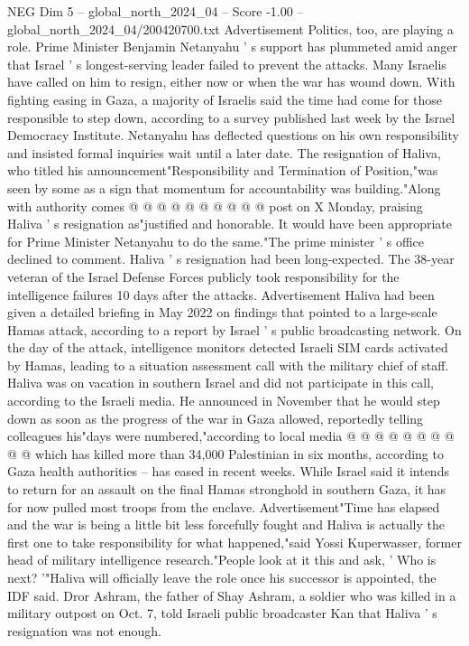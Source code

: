 \begin{textsample}{NEG Dim 5 – global\_north\_2024\_04 – Score -1.00 – global\_north\_2024\_04/200420700.txt}
Advertisement Politics, too, are playing a role.
Prime Minister Benjamin Netanyahu ' s support has plummeted amid anger that Israel ' s longest-serving leader failed to prevent the attacks.
Many Israelis have called on him to resign, either now or when the war has wound down.
With fighting easing in Gaza, a majority of Israelis said the time had come for those responsible to step down, according to a survey published last week by the Israel Democracy Institute.
Netanyahu has deflected questions on his own responsibility and insisted formal inquiries wait until a later date.
The resignation of Haliva, who titled his announcement"Responsibility and Termination of Position,"was seen by some as a sign that momentum for accountability was building."Along with authority comes @ @ @ @ @ @ @ @ @ @ post on X Monday, praising Haliva ' s resignation as"justified and honorable.
It would have been appropriate for Prime Minister Netanyahu to do the same."The prime minister ' s office declined to comment.
Haliva ' s resignation had been long-expected.
The 38-year veteran of the Israel Defense Forces publicly took responsibility for the intelligence failures 10 days after the attacks.
Advertisement Haliva had been given a detailed briefing in May 2022 on findings that pointed to a large-scale Hamas attack, according to a report by Israel ' s public broadcasting network.
On the day of the attack, intelligence monitors detected Israeli SIM cards activated by Hamas, leading to a situation assessment call with the military chief of staff.
Haliva was on vacation in southern Israel and did not participate in this call, according to the Israeli media.
He announced in November that he would step down as soon as the progress of the war in Gaza allowed, reportedly telling colleagues his"days were numbered,"according to local media @ @ @ @ @ @ @ @ @ @ which has killed more than 34,000 Palestinian in six months, according to Gaza health authorities -- has eased in recent weeks.
While Israel said it intends to return for an assault on the final Hamas stronghold in southern Gaza, it has for now pulled most troops from the enclave.
Advertisement"Time has elapsed and the war is being a little bit less forcefully fought and Haliva is actually the first one to take responsibility for what happened,"said Yossi Kuperwasser, former head of military intelligence research."People look at it this and ask, ' Who is next? '"Haliva will officially leave the role once his successor is appointed, the IDF said.
Dror Ashram, the father of Shay Ashram, a soldier who was killed in a military outpost on Oct. 7, told Israeli public broadcaster Kan that Haliva ' s resignation was not enough.

\end{textsample}
